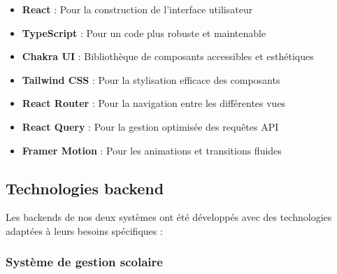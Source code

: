 \begin{itemize}
  \item \textbf{React} : Pour la construction de l'interface utilisateur
  
  \item \textbf{TypeScript} : Pour un code plus robuste et maintenable
  
  \item \textbf{Chakra UI} : Bibliothèque de composants accessibles et esthétiques
  
  \item \textbf{Tailwind CSS} : Pour la stylisation efficace des composants
  
  \item \textbf{React Router} : Pour la navigation entre les différentes vues
  
  \item \textbf{React Query} : Pour la gestion optimisée des requêtes API
  
  \item \textbf{Framer Motion} : Pour les animations et transitions fluides
\end{itemize}

\subsection{Technologies backend}

Les backends de nos deux systèmes ont été développés avec des technologies adaptées à leurs besoins spécifiques :

\subsubsection{Système de gestion scolaire}

